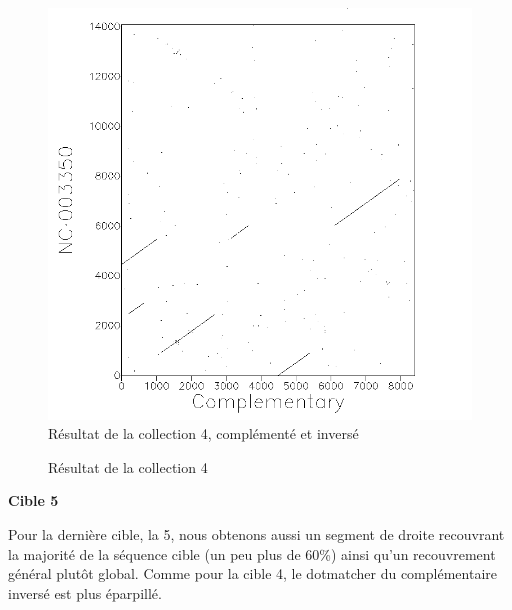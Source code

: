 \begin{figure}[!ht]
\begin{minipage}[c]{.46 \linewidth}
\begin{center}
			\includegraphics[scale= 0.4]{../res/cible4-ic.png}
			Résultat de la collection 4, complémenté et inversé
		\end{center}
	\end{minipage}
	\caption{Résultat de la collection 4}
\end{figure}

\FloatBarrier

\noindent\textbf{Cible 5}

Pour la dernière cible, la 5, nous obtenons aussi un segment de droite
recouvrant la majorité de la séquence cible (un peu plus de 60\%) ainsi qu'un
recouvrement général plutôt global. Comme pour la cible 4, le dotmatcher du
complémentaire inversé est plus éparpillé.

